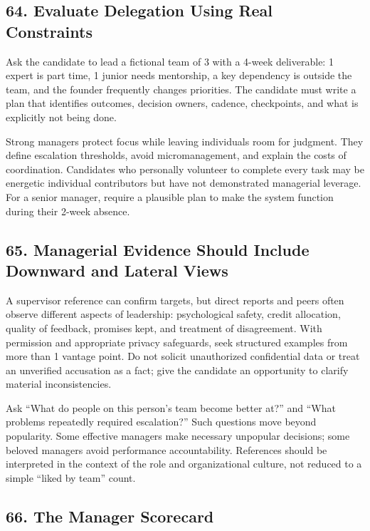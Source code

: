 \subsection*{64. Evaluate Delegation Using Real Constraints}

Ask the candidate to lead a fictional team of 3 with a 4-week deliverable: 1 expert is part time, 1 junior needs mentorship, a key dependency is outside the team, and the founder frequently changes priorities. The candidate must write a plan that identifies outcomes, decision owners, cadence, checkpoints, and what is explicitly not being done.

Strong managers protect focus while leaving individuals room for judgment. They define escalation thresholds, avoid micromanagement, and explain the costs of coordination. Candidates who personally volunteer to complete every task may be energetic individual contributors but have not demonstrated managerial leverage. For a senior manager, require a plausible plan to make the system function during their 2-week absence.

\subsection*{65. Managerial Evidence Should Include Downward and Lateral Views}

A supervisor reference can confirm targets, but direct reports and peers often observe different aspects of leadership: psychological safety, credit allocation, quality of feedback, promises kept, and treatment of disagreement. With permission and appropriate privacy safeguards, seek structured examples from more than 1 vantage point. Do not solicit unauthorized confidential data or treat an unverified accusation as a fact; give the candidate an opportunity to clarify material inconsistencies.

Ask ``What do people on this person's team become better at?'' and ``What problems repeatedly required escalation?'' Such questions move beyond popularity. Some effective managers make necessary unpopular decisions; some beloved managers avoid performance accountability. References should be interpreted in the context of the role and organizational culture, not reduced to a simple ``liked by team'' count.

\subsection*{66. The Manager Scorecard}

